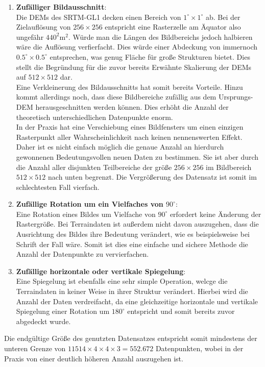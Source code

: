 \begin{enumerate}
    \item \textbf{Zufälliger Bildausschnitt}: \\
    Die \ac{DEM}s des SRTM-GL1 decken einen Bereich von $1^{\circ}\times1^{\circ}$ ab. Bei der Zielauflösung von $256\times256$ entspricht eine Rasterzelle am Äquator also ungefähr $440^2\text{m}^2$. Würde man die Längen des Bildbereichs jedoch halbieren wäre die Auflösung verfierfacht. Dies würde einer Abdeckung von immernoch $0.5^{\circ}\times0.5^{\circ}$ entsprechen, was genug Fläche für große Strukturen bietet. Dies stellt die Begründung für die zuvor bereits Erwähnte Skalierung der \ac{DEM}s auf $512\times512$ dar. \\ 
    Eine Verkleinerung des Bildausschnitts hat somit bereits Vorteile. Hinzu kommt allerdings noch, dass diese Bildbereiche zufällig aus dem Ursprungs-DEM herausgeschnitten werden können. Dies erhöht die Anzahl der theoretisch unterschiedlichen Datenpunkte enorm. \\
    In der Praxis hat eine Verschiebung eines Bildfensters um einen einzigen Rasterpunkt aller Wahrscheinlichkeit nach keinen nennenswerten Effekt. Daher ist es nicht einfach möglich die genaue Anzahl an hierdurch gewonnenen Bedeutungsvollen neuen Daten zu bestimmen. Sie ist aber durch die Anzahl aller disjunkten Teilbereiche der größe $256\times256$ im Bildbereich $512\times512$ nach unten begrenzt. Die Vergrößerung des Datensatz ist somit im schlechtesten Fall vierfach.
    \item \textbf{Zufällige Rotation um ein Vielfaches von $90^{\circ}$}: \\
    Eine Rotation eines Bildes um Vielfache von $90^{\circ}$ erfordert keine Änderung der Rastergröße. Bei Terraindaten ist außerdem nicht davon auszugehen, dass die Ausrichtung des Bildes ihre Bedeutung verändert, wie es beispielsweise bei Schrift der Fall wäre. Somit ist dies eine einfache und sichere Methode die Anzahl der Datenpunkte zu vervierfachen.
    \item \textbf{Zufällige horizontale oder vertikale Spiegelung}: \\
    Eine Spiegelung ist ebenfalls eine sehr simple Operation, welcge die Terraindaten in keiner Weise in ihrer Struktur verändert. Hierbei wird die Anzahl der Daten verdreifacht, da eine gleichzeitige horizontale und vertikale Spiegelung einer Rotation um $180^{\circ}$ entspricht und somit bereits zuvor abgedeckt wurde. 
\end{enumerate}
Die endgültige Größe des genutzten Datensatzes entspricht somit mindestens der unteren Grenze von $11514\times4\times4\times3 = 552.672$ Datenpunkten, wobei in der Praxis von einer deutlich höheren Anzahl auszugehen ist.


